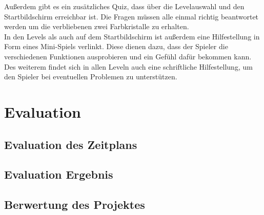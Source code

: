 \documentclass[10pt,a4paper,notitlepage]{report}
\begin{document}
	Außerdem gibt es ein zusätzliches Quiz, dass über die Levelauswahl und den Startbildschirm erreichbar ist. Die Fragen müssen alle einmal richtig beantwortet werden um die verbliebenen zwei Farbkristalle zu erhalten.\\
	In den Levels als auch auf dem Startbildschirm ist außerdem eine Hilfestellung in Form eines Mini-Spiels verlinkt. Diese dienen dazu, dass der Spieler die verschiedenen Funktionen ausprobieren und ein Gefühl dafür bekommen kann.\\
	Des weiterem findet sich in allen Leveln auch eine schriftliche Hilfestellung, um den Spieler bei eventuellen Problemen zu unterstützen.\\

	\chapter{Evaluation}
	\section{Evaluation des Zeitplans}

	\section{Evaluation Ergebnis}

	\section{Berwertung des Projektes}
\end{document}
